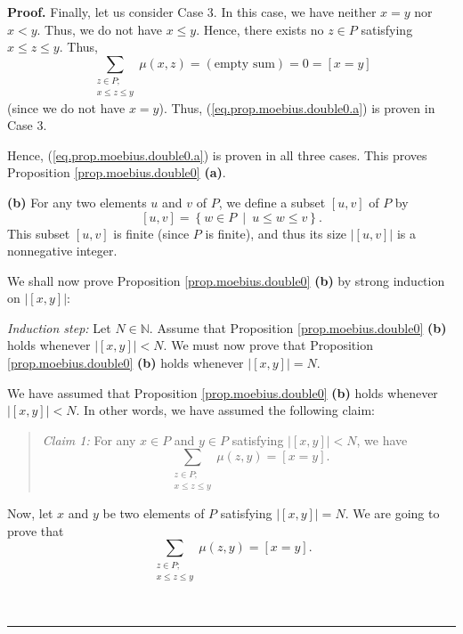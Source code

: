 \documentclass[numbers=enddot,12pt,final,onecolumn,notitlepage]{scrartcl}%
\theoremstyle{definition}
\newenvironment{statement}{\begin{quote}}{\end{quote}}
\newenvironment{proof}[1][Proof]{\noindent\textbf{#1.} }{\ \rule{0.5em}{0.5em}}
\newenvironment{vershort}{}{}
\let\sumnonlimits\sum
\renewcommand{\sum}{\sumnonlimits\limits}
\begin{document}
\begin{vershort}
\begin{proof}
Finally, let us consider Case 3. In this case, we have neither $x=y$ nor
$x<y$. Thus, we do not have $x\leq y$. Hence, there exists no $z\in P$
satisfying $x\leq z\leq y$. Thus,
\[
\sum_{\substack{z\in P;\\x\leq z\leq y}}\mu\left(  x,z\right)  =\left(
\text{empty sum}\right)  =0=\left[  x=y\right]
\]
(since we do not have $x=y$). Thus, (\ref{eq.prop.moebius.double0.a}) is
proven in Case 3.

Hence, (\ref{eq.prop.moebius.double0.a}) is proven in all three cases. This
proves Proposition \ref{prop.moebius.double0} \textbf{(a)}.

\textbf{(b)} For any two elements $u$ and $v$ of $P$, we define a subset
$\left[  u,v\right]  $ of $P$ by%
\[
\left[  u,v\right]  =\left\{  w\in P\ \mid\ u\leq w\leq v\right\}  .
\]
This subset $\left[  u,v\right]  $ is finite (since $P$ is finite), and thus
its size $\left\vert \left[  u,v\right]  \right\vert $ is a nonnegative integer.

We shall now prove Proposition \ref{prop.moebius.double0} \textbf{(b)} by
strong induction on $\left\vert \left[  x,y\right]  \right\vert $:

\textit{Induction step:} Let $N\in\mathbb{N}$. Assume that Proposition
\ref{prop.moebius.double0} \textbf{(b)} holds whenever $\left\vert \left[
x,y\right]  \right\vert <N$. We must now prove that Proposition
\ref{prop.moebius.double0} \textbf{(b)} holds whenever $\left\vert \left[
x,y\right]  \right\vert =N$.

We have assumed that Proposition \ref{prop.moebius.double0} \textbf{(b)} holds
whenever $\left\vert \left[  x,y\right]  \right\vert <N$. In other words, we
have assumed the following claim:

\begin{statement}
\textit{Claim 1:} For any $x\in P$ and $y\in P$ satisfying $\left\vert \left[
x,y\right]  \right\vert <N$, we have%
\[
\sum_{\substack{z\in P;\\x\leq z\leq y}}\mu\left(  z,y\right)  =\left[
x=y\right]  .
\]

\end{statement}

Now, let $x$ and $y$ be two elements of $P$ satisfying $\left\vert \left[
x,y\right]  \right\vert =N$. We are going to prove that%
\begin{equation}
\sum_{\substack{z\in P;\\x\leq z\leq y}}\mu\left(  z,y\right)  =\left[
x=y\right]  . \label{pf.prop.moebius.double0.short.b.goal}%
\end{equation}



\end{proof}
\end{vershort}
\end{document}
